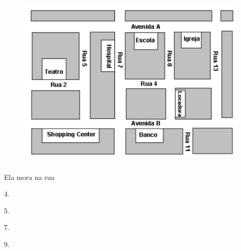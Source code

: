 {{{{\begin{figure}[H]
\centering\includegraphics[width=4.76042in,height=3.42708in]{./imgSAEB_6_MAT/media/image75.png}
\end{figure}

Ela mora na rua

\begin{multicols}{2}
\begin{escolha}
\item 4.
\item 5.
\item 7.
\item 9.
\end{escolha}
\end{multicols}



}}}}
